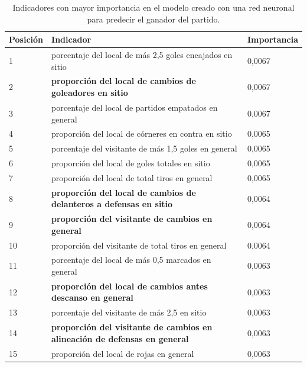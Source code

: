 \begin{table}[]
    \begin{tabularx}{\textwidth}{|l|>{\raggedright\arraybackslash}X|l|}
    \hline
    \rowcolor[HTML]{C0C0C0} 
    Posición & Indicador & Importancia \\ \hline
    1        &    porcentaje del local de más 2,5 goles encajados en sitio
    &    0,0067         \\ \hline
    2        &     \textbf{proporción del local de cambios de goleadores en sitio}      &    0,0067         \\ \hline
    3        &    porcentaje del local de partidos empatados en general       &   0,0067          \\ \hline
    4        &     proporción del local de córneres en contra en sitio      &     0,0065        \\ \hline
    5        &    porcentaje del visitante de más 1,5 goles en general       &    0,0065         \\ \hline
    6        &    proporción del local de goles totales en sitio       &   0,0065          \\ \hline
    7        &    proporción del local de total tiros en general       &   0,0065          \\ \hline
    8        &    \textbf{proporción del local de cambios de delanteros a defensas en sitio}       &     0,0064        \\ \hline
    9        &   \textbf{proporción del visitante de cambios en general}        &     0,0064        \\ \hline
    10        &   proporción del visitante de total tiros en general        &     0,0064        \\ \hline
    11       &     porcentaje del local de más 0,5 marcados en general      &     0,0063        \\ \hline
    12       &    \textbf{proporción del local de cambios antes descanso en general}       &    0,0063         \\ \hline
    13       &     porcentaje del visitante de más 2,5 en sitio       &    0,0063         \\ \hline
    14       &    \textbf{proporción del visitante de cambios en alineación de defensas en general}       &    0,0063         \\ \hline
    15       &     proporción del local de rojas en general      &    0,0063         \\ \hline

    \end{tabularx}
    \caption{Indicadores con mayor importancia en el modelo creado con una red neuronal para predecir el ganador del partido.}
    \label{table:importancia-indicadores-ganador}
    \end{table}

